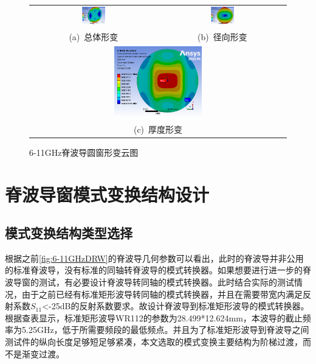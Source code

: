 \documentclass[master]{thesis-uestc}
\begin{document}
\begin{figure}[!htb]
    \small
    \centering
    \begin{tabular}{@{\ }c@{\ }c}
        \includegraphics[width=0.19\textwidth]{pic/chapter3/X输入窗总形变.png} & 
        \hspace{5pt}
        \includegraphics[width=0.19\textwidth]{pic/chapter3/X输入窗径向形变.png}     \\
        \mbox{\small (a) 总体形变}                                                                               & 
        \mbox{\small (b) 径向形变}                                                           \\[6bp]
        \multicolumn{2}{c}{\includegraphics[width=0.35\textwidth]{pic/chapter3/X输入窗厚度形变.png}} \\  %
        \multicolumn{2}{c}{\mbox{\small (c) 厚度形变}}             
    \end{tabular}
    \caption{6-11GHz脊波导圆窗形变云图}
    \label{fig:X输入窗形变}
\end{figure}
        
\section{脊波导窗模式变换结构设计}
\subsection{模式变换结构类型选择}
根据之前\ref{fig:6-11GHzDRW}的脊波导几何参数可以看出，此时的脊波导并非公用的标准脊波导，没有标准的同轴转脊波导的模式转换器。如果想要进行进一步的脊波导窗的测试，有必要设计脊波导转同轴的模式转换器。此时结合实际的测试情况，由于之前已经有标准矩形波导转同轴的模式转换器，并且在需要带宽内满足反射系数$S_{11}$<-25dB的反射系数要求。故设计脊波导到标准矩形波导的模式转换器。根据查表显示，标准矩形波导WR112的参数为28.499*12.624mm，本波导的截止频率为5.25GHz，低于所需要频段的最低频点。并且为了标准矩形波导到脊波导之间测试件的纵向长度足够短足够紧凑，本文选取的模式变换主要结构为阶梯过渡，而不是渐变过渡。
\end{document}
